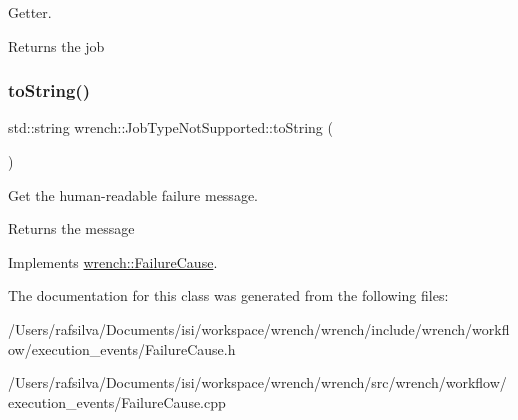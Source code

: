 Getter. 

\begin{DoxyReturn}{Returns}
the job 
\end{DoxyReturn}
\mbox{\label{classwrench_1_1_job_type_not_supported_ab6a302367f2db332484da0c256e3ae5c}} 
\subsubsection{\texorpdfstring{to\+String()}{toString()}}
{\footnotesize\ttfamily std\+::string wrench\+::\+Job\+Type\+Not\+Supported\+::to\+String (\begin{DoxyParamCaption}{ }\end{DoxyParamCaption})\hspace{0.3cm}{\ttfamily [virtual]}}



Get the human-\/readable failure message. 

\begin{DoxyReturn}{Returns}
the message 
\end{DoxyReturn}


Implements \hyperlink{classwrench_1_1_failure_cause_afbad248ebe902409f2cd4f1d6f2b867d}{wrench\+::\+Failure\+Cause}.



The documentation for this class was generated from the following files\+:\begin{DoxyCompactItemize}
\item 
/\+Users/rafsilva/\+Documents/isi/workspace/wrench/wrench/include/wrench/workflow/execution\+\_\+events/Failure\+Cause.\+h\item 
/\+Users/rafsilva/\+Documents/isi/workspace/wrench/wrench/src/wrench/workflow/execution\+\_\+events/Failure\+Cause.\+cpp\end{DoxyCompactItemize}
